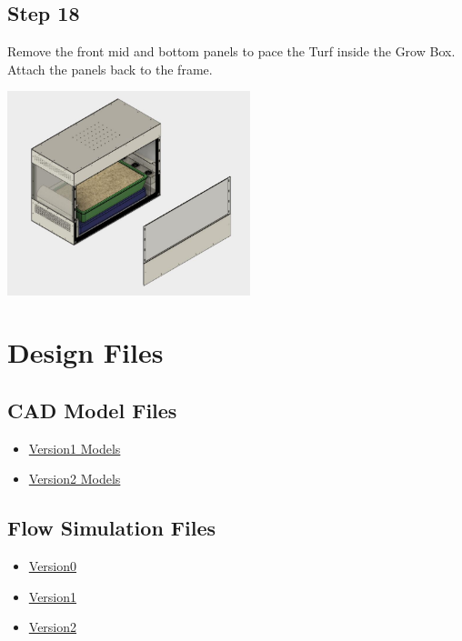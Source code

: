 \documentclass[a4paper,12pt,oneside]{book}
\begin{document}
\subsection*{Step 18}
Remove the front mid and bottom panels to pace the Turf inside the Grow Box. Attach the panels back to the frame.\\
\begin{center}
  \includegraphics[width=200pt]{18}
  \end{center}

\section {Design Files}
\subsection{CAD Model Files}
\begin{itemize}
    \item \href{https://drive.google.com/file/d/0B8nJz0e_p6YNYkN4LWZJdHdqNEE/view?usp=sharing}{Version1 Models}
    \item \href{https://drive.google.com/open?id=0B8nJz0e_p6YNaC00T0h0N1Y0VVE}{Version2 Models}
\end{itemize}
\subsection{Flow Simulation Files}
\begin{itemize}
    \item \href{https://drive.google.com/open?id=0B8nJz0e_p6YNY2tDaUpiR3BRZXc}{Version0}
    \item \href{https://drive.google.com/open?id=0B8nJz0e_p6YNaVZpd2Y5OVdYSVE}{Version1}
    \item \href{https://drive.google.com/open?id=0B8nJz0e_p6YNTGNyNHEzUktRTFk}{Version2}
\end{itemize}
\end{document}
